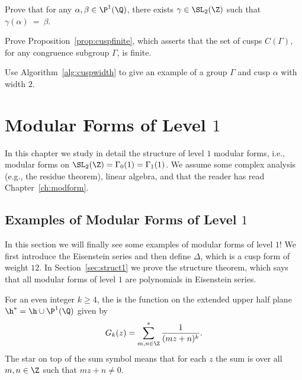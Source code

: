 \begin{exercises}
\item \label{ex:sl2ztrans}
Prove that for any $\alpha, \beta\in\P^1(\Q)$, there exists
  $\gamma\in\SL_2(\Z)$ such that $\gamma(\alpha)~=~\beta$.

\item \label{ex:cuspfinite}
Prove Proposition~\ref{prop:cuspfinite}, which
asserts that the set of cusps $C(\Gamma)$, for any
congruence subgroup $\Gamma$, is finite. 

\item \label{ex:cuspwidth}
Use Algorithm~\ref{alg:cuspwidth} to give an 
example of a group $\Gamma$ and cusp $\alpha$
with width $2$. 

\end{exercises}


\chapter{Modular Forms of Level $1$}\label{ch:level1}

In this chapter we study in detail the structure of level $1$ modular
forms, i.e., modular forms on $\SL_2(\Z)=\Gamma_0(1)=\Gamma_1(1)$.  
We assume some complex analysis (e.g., the residue theorem),
linear algebra, and that the reader has
read Chapter~\ref{ch:modform}.

\section{Examples of Modular Forms of Level $1$}\label{sec:level_one_eisen}

In this section we will finally see some examples of modular forms of
level $1$!  We first introduce the Eisenstein series and
then define $\Delta$, which is a cusp form of weight $12$.  In
Section~\ref{sec:struct1} we  prove the structure theorem,
which says that all modular forms of level $1$ are polynomials
in Eisenstein series. 

For an even integer $k\geq 4$, the 
is the function on the extended
upper half plane $\h^*=\h\cup\P^1(\Q)$ given
by
\begin{equation}\label{eqn:gk}
  G_k(z) = \sum_{m,n\in\Z}^{*} \frac{1}{(mz+n)^k}.
\end{equation}
The star on top of the sum symbol means that
for each $z$ the sum is over all $m,n\in\Z$ such that
$mz+n\neq 0$.

